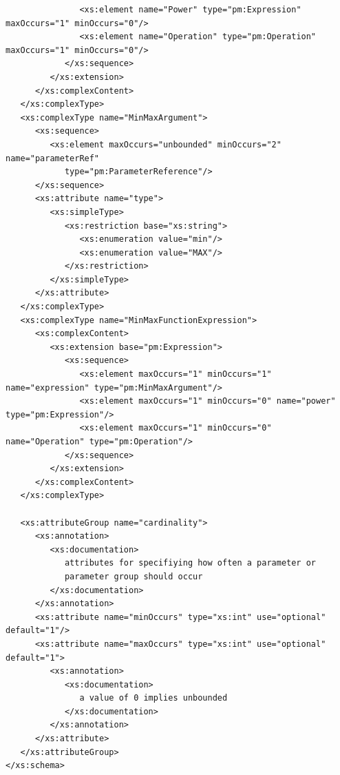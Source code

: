 \documentclass[a4paper,11pt] {ivoa}
\begin{document}
\begin{lstlisting}
               <xs:element name="Power" type="pm:Expression" maxOccurs="1" minOccurs="0"/>
               <xs:element name="Operation" type="pm:Operation" maxOccurs="1" minOccurs="0"/>
            </xs:sequence>
         </xs:extension>
      </xs:complexContent>
   </xs:complexType>
   <xs:complexType name="MinMaxArgument">
      <xs:sequence>
         <xs:element maxOccurs="unbounded" minOccurs="2" name="parameterRef"
            type="pm:ParameterReference"/>
      </xs:sequence>
      <xs:attribute name="type">
         <xs:simpleType>
            <xs:restriction base="xs:string">
               <xs:enumeration value="min"/>
               <xs:enumeration value="MAX"/>
            </xs:restriction>
         </xs:simpleType>
      </xs:attribute>
   </xs:complexType>
   <xs:complexType name="MinMaxFunctionExpression">
      <xs:complexContent>
         <xs:extension base="pm:Expression">
            <xs:sequence>
               <xs:element maxOccurs="1" minOccurs="1" name="expression" type="pm:MinMaxArgument"/>
               <xs:element maxOccurs="1" minOccurs="0" name="power" type="pm:Expression"/>
               <xs:element maxOccurs="1" minOccurs="0" name="Operation" type="pm:Operation"/>
            </xs:sequence>
         </xs:extension>
      </xs:complexContent>
   </xs:complexType>

   <xs:attributeGroup name="cardinality">
      <xs:annotation>
         <xs:documentation>
            attributes for specifiying how often a parameter or
            parameter group should occur
         </xs:documentation>
      </xs:annotation>
      <xs:attribute name="minOccurs" type="xs:int" use="optional" default="1"/>
      <xs:attribute name="maxOccurs" type="xs:int" use="optional" default="1">
         <xs:annotation>
            <xs:documentation>
               a value of 0 implies unbounded
            </xs:documentation>
         </xs:annotation>
      </xs:attribute>
   </xs:attributeGroup>
</xs:schema>
\end{lstlisting}
\end{document}
